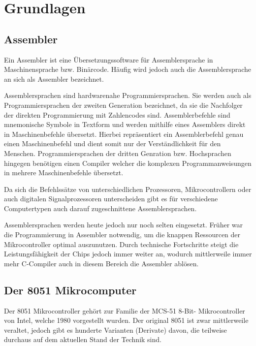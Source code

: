 \chapter{Grundlagen}

\section{Assembler}

Ein Assembler ist eine Übersetzungssoftware für Assemblersprache in Maschinensprache bzw. Binärcode. Häufig wird jedoch auch die Assemblersprache an sich als Assembler bezeichnet.

Assemblersprachen sind hardwarenahe Programmiersprachen. Sie werden auch als Programmiersprachen der zweiten Generation bezeichnet, da sie die Nachfolger der direkten Programmierung mit Zahlencodes sind. Assemblerbefehle sind mnemonische Symbole in Textform und werden mithilfe eines Assemblers direkt in Maschinenbefehle übersetzt. Hierbei repräsentiert ein Assemblerbefehl genau einen Maschinenbefehl und dient somit nur der Verständlichkeit für den Menschen. Programmiersprachen der dritten Genration bzw. Hochsprachen hingegen benötigen einen Compiler welcher die komplexen Programmanweisungen in mehrere Maschinenbefehle übersetzt. 

Da sich die Befehlssätze von unterschiedlichen Prozessoren, Mikrocontrollern oder auch digitalen Signalprozessoren unterscheiden gibt es für verschiedene Computertypen auch darauf zugeschnittene Assemblersprachen.

Assemblersprachen werden heute jedoch nur noch selten eingesetzt. Früher war die Programmierung in Assembler notwendig, um die knappen Ressourcen der Mikrocontroller optimal auszunutzen. Durch technische Fortschritte steigt die Leistungsfähigkeit der Chips jedoch immer weiter an, wodurch mittlerweile immer mehr C-Compiler auch in diesem Bereich die Assembler ablösen.~\cite{wiki_Assembler}

\newpage 

\section{Der 8051 Mikrocomputer}

Der 8051 Mikrocontroller gehört zur Familie der MCS-51 8-Bit- Mikrocontroller von Intel, welche 1980 vorgestellt wurden. Der original 8051 ist zwar mittlerweile veraltet, jedoch gibt es hunderte Varianten (Derivate) davon, die teilweise durchaus auf dem aktuellen Stand der Technik sind.~\cite{wiki_MCS}

